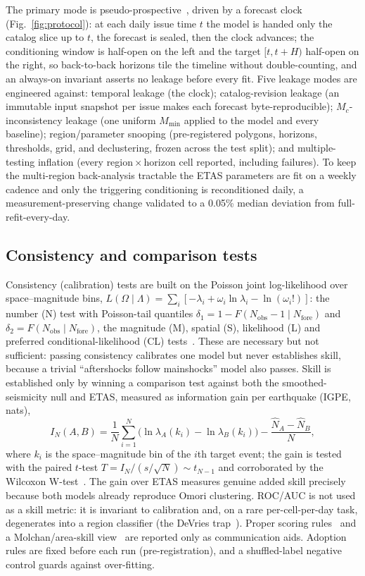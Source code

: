 \documentclass[journal]{IEEEtran}
\begin{document}
The primary mode is pseudo-prospective~\cite{mizrahi2024}, driven by a forecast clock
(Fig.~\ref{fig:protocol}): at each daily issue time $t$ the model is handed only the catalog
slice up to $t$, the forecast is sealed, then the clock advances; the conditioning window is
half-open on the left and the target $[t,t+H)$ half-open on the right, so back-to-back
horizons tile the timeline without double-counting, and an always-on invariant asserts no
leakage before every fit. Five leakage modes are engineered against: temporal leakage
(the clock); catalog-revision leakage (an immutable input snapshot per issue makes each
forecast byte-reproducible); $M_c$-inconsistency leakage (one uniform $M_{\min}$ applied to
the model and every baseline); region/parameter snooping (pre-registered polygons, horizons,
thresholds, grid, and declustering, frozen across the test split); and multiple-testing
inflation (every region\,$\times$\,horizon cell reported, including failures). To keep the
multi-region back-analysis tractable the ETAS parameters are fit on a weekly cadence and
only the triggering conditioning is reconditioned daily, a measurement-preserving change
validated to a 0.05\% median deviation from full-refit-every-day.

\subsection{Consistency and comparison tests}

Consistency (calibration) tests are built on the Poisson joint log-likelihood over
space--magnitude bins, $L(\Omega\mid\Lambda)=\sum_i[-\lambda_i+\omega_i\ln\lambda_i-\ln(\omega_i!)]$:
the number (N) test with Poisson-tail quantiles $\delta_1=1-F(N_\text{obs}-1\mid N_\text{fore})$
and $\delta_2=F(N_\text{obs}\mid N_\text{fore})$, the magnitude (M), spatial (S), likelihood
(L) and preferred conditional-likelihood (CL) tests~\cite{schorlemmer2007,zechar2010}. These
are necessary but not sufficient: passing consistency calibrates one model but never
establishes skill, because a trivial ``aftershocks follow mainshocks'' model also passes.
Skill is established only by winning a comparison test against both the smoothed-seismicity
null and ETAS, measured as information gain per earthquake (IGPE, nats),
\begin{equation}
I_N(A,B)=\frac1N\sum_{i=1}^N\big(\ln\lambda_A(k_i)-\ln\lambda_B(k_i)\big)-\frac{\hat N_A-\hat N_B}{N},
\label{eq:igpe}
\end{equation}
where $k_i$ is the space--magnitude bin of the $i$th target event; the gain is tested with the
paired $t$-test $T=I_N/(s/\sqrt N)\sim t_{N-1}$ and corroborated by the
Wilcoxon W-test~\cite{rhoades2011}. The gain over ETAS measures genuine added skill
precisely because both models already reproduce Omori clustering. ROC/AUC is not used as a
skill metric: it is invariant to calibration and, on a rare per-cell-per-day task,
degenerates into a region classifier (the DeVries trap~\cite{devries2018,mignan2019}). Proper
scoring rules~\cite{gneiting2007} and a Molchan/area-skill view~\cite{zechar2008} are
reported only as communication aids. Adoption rules are fixed before each run
(pre-registration), and a shuffled-label negative control guards against over-fitting.
\end{document}
